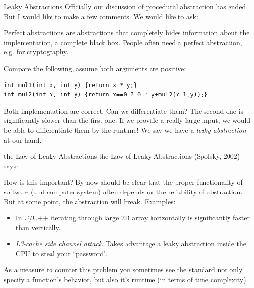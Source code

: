 \begin{frame}[fragile]{Leaky Abstractions}
Officially our discussion of procedural abstraction has ended. But I would like to make a few comments. We would like to ask:
\begin{center}
\end{center}
Perfect abstractions are abstractions that completely hides information about the implementation, a complete black box. People often need a perfect abstraction, e.g. for cryptography.

Compare the following, assume both arguments are positive:
\begin{verbatim}
int mul1(int x, int y) {return x * y;}
int mul2(int x, int y) {return x==0 ? 0 : y+mul2(x-1,y));}
\end{verbatim}
Both implementation are correct. Can we differentiate them? The second one is significantly slower than the first one. If we provide a really large input, we would be able to differentiate them by the runtime! We say we have a \textit{leaky abstraction} at our hand.
\end{frame}

\begin{frame}[fragile]{the Law of Leaky Abstractions}
the Law of Leaky Abstractions (Spolsky, 2002) says:
\begin{quotation}
\end{quotation}
How is this important? By now should be clear that the proper functionality of software (and computer system) often depends on the reliability of abstraction. But at some point, the abstraction will break. Examples:
\begin{itemize}
	\item In C/C++ iterating through large 2D array horizontally is significantly faster than vertically.
	\item \textit{L3-cache side channel attack}. Takes advantage a leaky abstraction inside the CPU to steal your ``password".
\end{itemize}
As a measure to counter this problem you sometimes see the standard not only specify a function's behavior, but also it's runtime (in terms of time complexity).
\end{frame}

